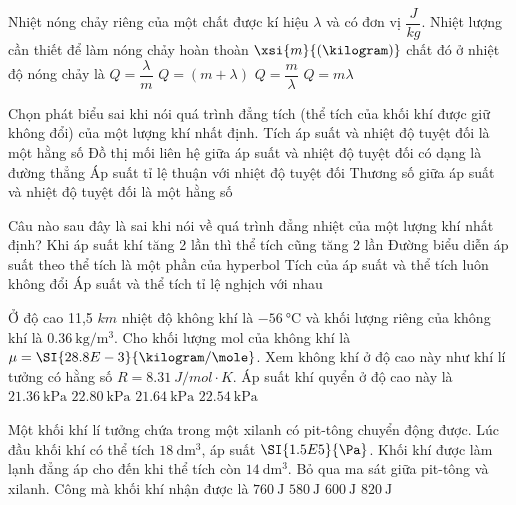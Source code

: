 \begin{ex}
	Nhiệt nóng chảy riêng của một chất được kí hiệu $\lambda$ và có đơn vị $\dfrac{J}{kg}$. Nhiệt lượng cần thiết để làm nóng chảy hoàn thoàn $\xsi{m}{\left(\kilogram\right)}$ chất đó ở nhiệt độ nóng chảy là 
	\choice
	{$Q=\dfrac{\lambda}{m}$}
	{$Q=(m+\lambda)$}
	{$Q=\dfrac{m}{\lambda}$}
	{\True $Q=m\lambda$}
	\loigiai{}
\end{ex}
\begin{ex}
	Chọn phát biểu sai khi nói quá trình đẳng tích (thể tích của khối khí được giữ không đổi) của một lượng khí nhất định.
	\choice
	{\True Tích áp suất và nhiệt độ tuyệt đối là một hằng số}
	{Đồ thị mối liên hệ giữa áp suất và nhiệt độ tuyệt đối có dạng là đường thẳng}
	{Áp suất tỉ lệ thuận với nhiệt độ tuyệt đối}
	{Thương số giữa áp suất và nhiệt độ tuyệt đối là một hằng số}
	\loigiai{}
\end{ex}
\begin{ex}
	Câu nào sau đây là sai khi nói về quá trình đẳng nhiệt của một lượng khí nhất định?
	\choice
	{\True Khi áp suất khí tăng 2 lần thì thể tích cũng tăng 2 lần}
	{Đường biểu diễn áp suất theo thể tích là một phần của hyperbol}
	{Tích của áp suất và thể tích luôn không đổi}
	{Áp suất và thể tích tỉ lệ nghịch với nhau}
	\loigiai{}
\end{ex}
\begin{ex}
	Ở độ cao 11,5 $\si{km}$ nhiệt độ không khí là $\SI{-56}{\celsius}$ và khối lượng riêng của không khí là $\SI{0.36}{\kilogram/\meter^3}$. Cho khối lượng mol của không khí là $\mu=\SI{28.8E-3}{\kilogram/\mole}$. Xem không khí ở độ cao này như khí lí tưởng có hằng số $R=\SI{8.31}{J/mol\cdot K}$. Áp suất khí quyển ở độ cao này là
	\choice
	{$\SI{21.36}{\kPa}$}
	{$\SI{22.80}{\kPa}$}
	{$\SI{21.64}{\kPa}$}
	{\True $\SI{22.54}{\kPa}$}
\end{ex}
\begin{ex}
	Một khối khí lí tưởng chứa trong một xilanh có pit-tông chuyển động được. Lúc đầu khối khí có thể tích $\SI{18}{\dm^3}$, áp suất $\SI{1.5E5}{\Pa}$. Khối khí được làm lạnh đẳng áp cho đến khi thể tích còn $\SI{14}{\dm^3}$. Bỏ qua ma sát giữa pit-tông và xilanh. Công mà khối khí nhận được là
	\choice
	{$\SI{760}{\J}$}
	{$\SI{580}{\J}$}
	{\True $\SI{600}{\J}$}
	{$\SI{820}{\J}$}
\end{ex}
